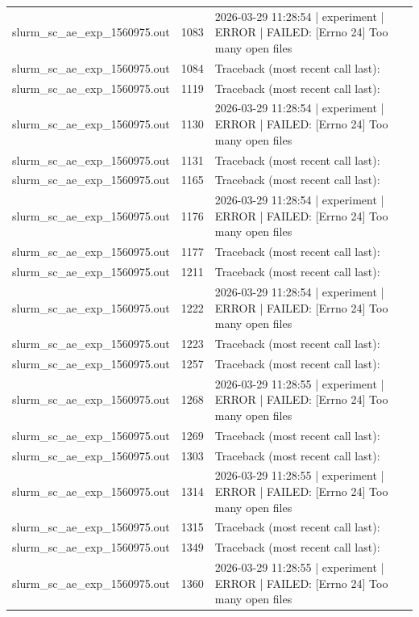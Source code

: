 \begin{tabular}{lrl}
slurm\_sc\_ae\_exp\_1560975.out & 1083 & 2026-03-29 11:28:54 | experiment | ERROR |   FAILED: [Errno 24] Too many open files \\
slurm\_sc\_ae\_exp\_1560975.out & 1084 & Traceback (most recent call last): \\
slurm\_sc\_ae\_exp\_1560975.out & 1119 & Traceback (most recent call last): \\
slurm\_sc\_ae\_exp\_1560975.out & 1130 & 2026-03-29 11:28:54 | experiment | ERROR |   FAILED: [Errno 24] Too many open files \\
slurm\_sc\_ae\_exp\_1560975.out & 1131 & Traceback (most recent call last): \\
slurm\_sc\_ae\_exp\_1560975.out & 1165 & Traceback (most recent call last): \\
slurm\_sc\_ae\_exp\_1560975.out & 1176 & 2026-03-29 11:28:54 | experiment | ERROR |   FAILED: [Errno 24] Too many open files \\
slurm\_sc\_ae\_exp\_1560975.out & 1177 & Traceback (most recent call last): \\
slurm\_sc\_ae\_exp\_1560975.out & 1211 & Traceback (most recent call last): \\
slurm\_sc\_ae\_exp\_1560975.out & 1222 & 2026-03-29 11:28:54 | experiment | ERROR |   FAILED: [Errno 24] Too many open files \\
slurm\_sc\_ae\_exp\_1560975.out & 1223 & Traceback (most recent call last): \\
slurm\_sc\_ae\_exp\_1560975.out & 1257 & Traceback (most recent call last): \\
slurm\_sc\_ae\_exp\_1560975.out & 1268 & 2026-03-29 11:28:55 | experiment | ERROR |   FAILED: [Errno 24] Too many open files \\
slurm\_sc\_ae\_exp\_1560975.out & 1269 & Traceback (most recent call last): \\
slurm\_sc\_ae\_exp\_1560975.out & 1303 & Traceback (most recent call last): \\
slurm\_sc\_ae\_exp\_1560975.out & 1314 & 2026-03-29 11:28:55 | experiment | ERROR |   FAILED: [Errno 24] Too many open files \\
slurm\_sc\_ae\_exp\_1560975.out & 1315 & Traceback (most recent call last): \\
slurm\_sc\_ae\_exp\_1560975.out & 1349 & Traceback (most recent call last): \\
slurm\_sc\_ae\_exp\_1560975.out & 1360 & 2026-03-29 11:28:55 | experiment | ERROR |   FAILED: [Errno 24] Too many open files \\

\end{tabular}
